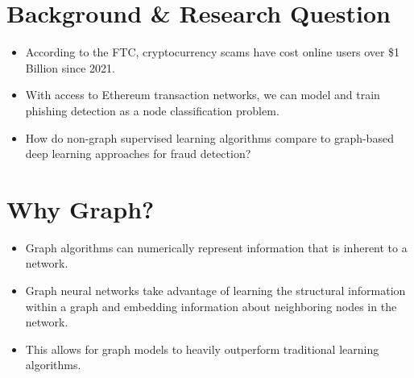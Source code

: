 \documentclass[article,36pt,extrafontsizes,oneside,openany,oldfontcommands]{memoir}
\begin{document}
\begin{adjmulticols*}{3}{0.5in}{0.5in}
\color{bodytextcol}

\section{Background \& Research Question}

\begin{adjustwidth}{0in}{0in}
\begin{itemize}[topsep=0pt,itemsep=0ex,partopsep=0ex,parsep=0ex]
\item According to the FTC, cryptocurrency scams have cost online users over \$1 Billion since 2021.
\item With access to Ethereum transaction networks, we can model and train phishing detection as a node classification problem.
\item How do non-graph supervised learning algorithms compare to graph-based deep learning approaches for fraud detection? 
\end{itemize}
\end{adjustwidth}


\section{Why Graph?}

\begin{adjustwidth}{0in}{0in}
\begin{itemize}[topsep=0pt,itemsep=0ex,partopsep=0ex,parsep=0ex]
\item Graph algorithms can numerically represent information that is inherent to a network.
\item Graph neural networks take advantage of learning the structural information within a graph and embedding information about neighboring nodes in the network.
\item This allows for graph models to heavily outperform traditional learning algorithms.

\end{itemize} 
\end{adjustwidth}



\end{adjmulticols*}
\end{document}
